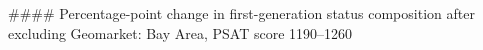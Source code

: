 #### Percentage-point change in first-generation status composition after excluding Geomarket: Bay Area, PSAT score 1190–1260
